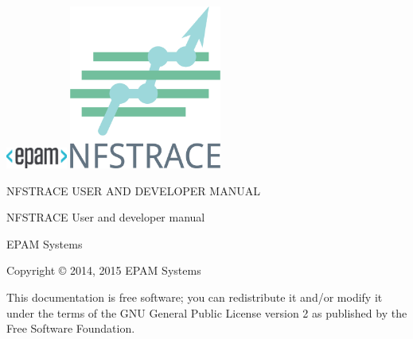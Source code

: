 \documentclass[oneside]{article}
\begin{document}

\begin{titlepage}

\newcommand{\HRule}{\rule{\linewidth}{0.5mm}} %

\includegraphics[width=2cm]{pictures/epam-logo.png}
\newline
\center
\vspace{3cm}
\includegraphics[width=5cm]{pictures/logo.png}

\par\vspace{1cm}
\center
{\huge NFSTRACE USER AND DEVELOPER MANUAL}\\[0.4cm] %
{} 
\vfill 
\end{titlepage} 


\newpage

\vspace{5mm}
NFSTRACE User and developer manual 

\vspace{5mm}
EPAM Systems 

\vspace{5mm}
Copyright © 2014, 2015 EPAM Systems 

\vspace{5mm} This documentation is free software; you can redistribute it
and/or modify it under the terms of the GNU General Public License version 2 as
published by the Free Software Foundation.  
\end{document}
